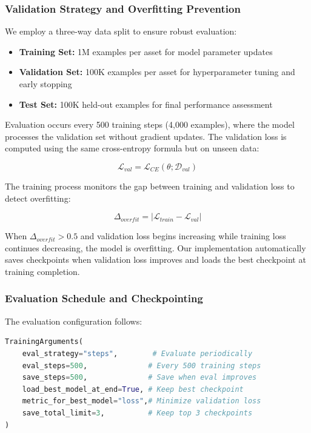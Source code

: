 \documentclass{report}
\begin{document}
\subsubsection{Validation Strategy and Overfitting Prevention}

We employ a three-way data split to ensure robust evaluation:

\begin{itemize}
    \item \textbf{Training Set:} 1M examples per asset for model parameter updates
    \item \textbf{Validation Set:} 100K examples per asset for hyperparameter tuning and early stopping
    \item \textbf{Test Set:} 100K held-out examples for final performance assessment
\end{itemize}

Evaluation occurs every 500 training steps (4,000 examples), where the model processes the validation set without gradient updates. The validation loss is computed using the same cross-entropy formula but on unseen data:

\begin{equation}
\mathcal{L}_{val} = \mathcal{L}_{CE}(\theta; \mathcal{D}_{val})
\end{equation}

The training process monitors the gap between training and validation loss to detect overfitting:

\begin{equation}
\Delta_{overfit} = |\mathcal{L}_{train} - \mathcal{L}_{val}|
\end{equation}

When $\Delta_{overfit} > 0.5$ and validation loss begins increasing while training loss continues decreasing, the model is overfitting. Our implementation automatically saves checkpoints when validation loss improves and loads the best checkpoint at training completion.

\subsubsection{Evaluation Schedule and Checkpointing}

The evaluation configuration follows:

\begin{lstlisting}[language=Python, caption=Automatic Evaluation Configuration]
TrainingArguments(
    eval_strategy="steps",        # Evaluate periodically
    eval_steps=500,              # Every 500 training steps
    save_steps=500,              # Save when eval improves
    load_best_model_at_end=True, # Keep best checkpoint
    metric_for_best_model="loss",# Minimize validation loss
    save_total_limit=3,          # Keep top 3 checkpoints
)
\end{lstlisting}
\end{document}
